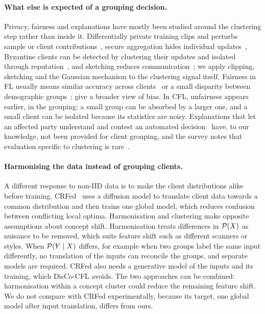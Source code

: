 \paragraph{What else is expected of a grouping decision.} Privacy, fairness and explanations have mostly been studied around the clustering step rather than inside it. Differentially private training clips and perturbs sample or client contributions~\citep{mcmahan2018dpfedavg,abadi2016dpsgd}, secure aggregation hides individual updates~\citep{bonawitz2017secagg}, Byzantine clients can be detected by clustering their updates and isolated through reputation~\citep{dang2026fortress}, and sketching reduces communication~\citep{rothchild2020fetchsgd}; we apply clipping, sketching and the Gaussian mechanism to the clustering signal itself. Fairness in FL usually means similar accuracy across clients~\citep{li2020qffl,mohri2019afl,li2021ditto} or a small disparity between demographic groups~\citep{dang2026fedfairgnn}; \citet{mehrabi2021bias} give a broader view of bias. In CFL, unfairness appears earlier, in the grouping: a small group can be absorbed by a larger one, and a small client can be isolated because its statistics are noisy. Explanations that let an affected party understand and contest an automated decision~\citep{wachter2018counterfactual,doshivelez2017interpretable} have, to our knowledge, not been provided for client grouping, and the survey notes that evaluation specific to clustering is rare~\citep[Sec.~4.5.3]{benali2026survey}.

\paragraph{Harmonising the data instead of grouping clients.} A different response to non-IID data is to make the client distributions alike before training. CRFed~\citep{chen2024crfed} uses a diffusion model to translate client data towards a common distribution and then trains one global model, which reduces confusion between conflicting local optima. Harmonisation and clustering make opposite assumptions about concept shift. Harmonisation treats differences in $\mathcal{P}(X)$ as nuisance to be removed, which suits feature shift such as different scanners or styles. When $\mathcal{P}(Y\mid X)$ differs, for example when two groups label the same input differently, no translation of the inputs can reconcile the groups, and separate models are required. CRFed also needs a generative model of the inputs and its training, which DisCo-CFL avoids. The two approaches can be combined: harmonisation within a concept cluster could reduce the remaining feature shift. We do not compare with CRFed experimentally, because its target, one global model after input translation, differs from ours.

